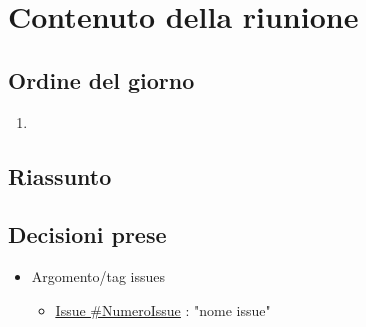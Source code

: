 \documentclass[10pt]{article}
\begin{document}
\section{Contenuto della riunione}
\subsection{Ordine del giorno}
\begin{enumerate}
  \item 
\end{enumerate}

\subsection{Riassunto}

\subsection{Decisioni prese}
\begin{itemize}
\item Argomento/tag issues
    \begin{itemize}
        \item \href{https://github.com/techminds-unipd/docs/issues/<NumeroIssue>}{\underline {Issue \#NumeroIssue}}
        : "nome issue"
    \end{itemize}
\end{itemize}
\end{document}
